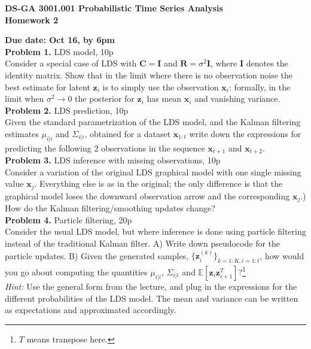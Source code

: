 \documentclass[12pt]{article}
\newcommand{\vect}[1]{\mathbf{#1}}
\begin{document}
\thispagestyle{empty}
\begin{center}

\textbf{DS-GA 3001.001 Probabilistic Time Series Analysis\\
Homework 2}
\end{center}

\noindent \textbf{Due date: Oct 16, by 6pm}\\

\noindent \textbf{Problem 1.} LDS model, 10p \\ %
Consider a special case of LDS with $\vect{C} = \vect{I}$ and  $\vect{R} = \sigma^2 \vect{I}$, where $\vect{I}$ denotes the identity matrix. 
Show that in the limit where there is no observation noise the best estimate for latent $\vect{z}_i$ is to simply use the observation $\vect{x}_i$: 
formally, in the limit when $\sigma^2 \rightarrow 0$ the posterior for $\vect{z}_i$ has mean $\vect{x}_i$ and vanishing variance.\\

\noindent \textbf{Problem 2. } LDS prediction, 10p \\%
Given the standard parametrization of the LDS model, and the Kalman filtering estimates $\mu_{i|i}$ and $\Sigma_{i|i}$, obtained for a dataset $\vect{x}_{1:t}$ write down the expressions for predicting the following 2 observations in the sequence $\vect{x}_{t+1}$ and  $\vect{x}_{t+2}$.\\

\noindent \textbf{Problem 3.} LDS inference with missing observations, 10p \\%
Consider a variation of the original LDS graphical model with one single missing value $\mathbf{x}_j$. Everything else is as in the original; the only difference is that the graphical model loses the downward observation arrow and the corresponding $\mathbf{x}_j$.)
How do the Kalman filtering/smoothing updates change?\\

\noindent \textbf{Problem 4.}  Particle filtering, 20p\\%
Consider the usual LDS model, but where inference is done using particle filtering instead of the traditional Kalman filter. A) Write down pseudocode for the particle updates. B) Given the generated samples, $\{\mathbf{z}_i^{(k)}\}_{k=1:K, i=1:t}$, how would you go about computing the quantities $\mu_{i|i}$, $\Sigma_{i|i}$ and $\mathbb{E}[\mathbf{z}_i \mathbf{z}_{i+1}^T]$?\footnote{$T$ means transpose here.}\\
\emph{Hint:} Use the general form from the lecture, and plug in the expressions for the different probabilities of the LDS model. The mean and variance can be written as expectations and approximated accordingly.
\end{document}
